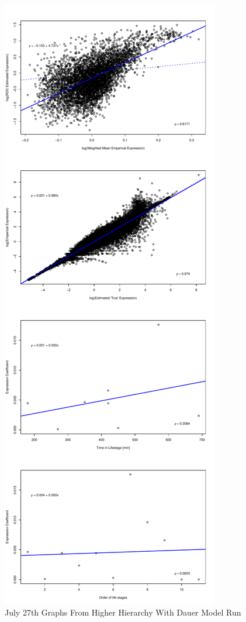 \documentclass[letterpaper,index=totoc,hyperref,openany]{labbook} %
\begin{document}
\begin{figure}[H]
\begin{center}
\includegraphics[scale=.45]{../C_Elegans/Higher_Hierarchy_with_Dauer_1/Plots/Higher_hierarchy_with_dauer_original_model_celegans_weighted_expr_vector_beta_noise_fixed_sroc_withIntercept.pdf}
\end{center}
\caption{July 27th Graphs From Higher Hierarchy With Dauer Model Run}
\end{figure}
\end{document}
